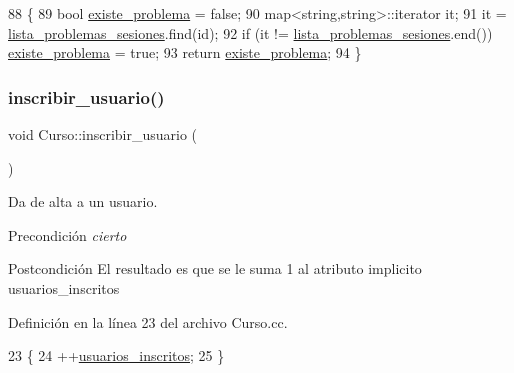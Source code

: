 \begin{DoxyCode}
88                                      \{
89     \textcolor{keywordtype}{bool} \mbox{\hyperlink{class_curso_ac697ad831382b4e3ccd85365e835344f}{existe\_problema}} = \textcolor{keyword}{false};
90     map<string,string>::iterator it;
91     it = \mbox{\hyperlink{class_curso_a99375622457c06d91cdeede8686f6da5}{lista\_problemas\_sesiones}}.find(\textcolor{keywordtype}{id});
92     \textcolor{keywordflow}{if} (it != \mbox{\hyperlink{class_curso_a99375622457c06d91cdeede8686f6da5}{lista\_problemas\_sesiones}}.end()) 
      \mbox{\hyperlink{class_curso_ac697ad831382b4e3ccd85365e835344f}{existe\_problema}} = \textcolor{keyword}{true};
93     \textcolor{keywordflow}{return} \mbox{\hyperlink{class_curso_ac697ad831382b4e3ccd85365e835344f}{existe\_problema}};
94 \}
\end{DoxyCode}
\mbox{\label{class_curso_a7b4f00ccb63ad80befcd77500e15c939}} 
\subsubsection{\texorpdfstring{inscribir\+\_\+usuario()}{inscribir\_usuario()}}
{\footnotesize\ttfamily void Curso\+::inscribir\+\_\+usuario (\begin{DoxyParamCaption}{ }\end{DoxyParamCaption})}



Da de alta a un usuario. 

\begin{DoxyPrecond}{Precondición}
{\itshape cierto} 
\end{DoxyPrecond}
\begin{DoxyPostcond}{Postcondición}
El resultado es que se le suma 1 al atributo implicito usuarios\+\_\+inscritos 
\end{DoxyPostcond}


Definición en la línea 23 del archivo Curso.\+cc.


\begin{DoxyCode}
23                               \{
24   ++\mbox{\hyperlink{class_curso_a94c41191b9cd9dc8af95e7d2560a2381}{usuarios\_inscritos}};
25 \}
\end{DoxyCode}
\mbox{\label{class_curso_a6c279cf46fc2df8e8f1c8ae93cdffec9}} 
